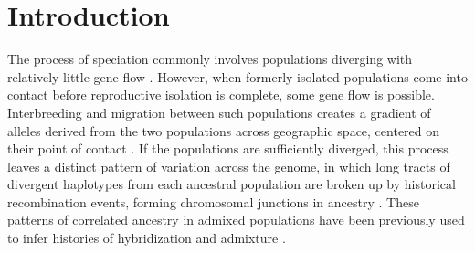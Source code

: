 \documentclass[11pt,letterpaper]{article}
\begin{document}
\linenumbers
\doublespacing


\section*{Introduction}


The process of speciation commonly involves populations diverging with relatively little gene flow \citep{Coyne2004}.  
However, when formerly isolated populations come into contact before reproductive isolation is complete, some gene flow is possible.
Interbreeding and migration between such populations  
creates a gradient of alleles derived from the two populations across geographic space,
centered on their point of contact \citep[reviewed by][]{Barton1985}. 
If the populations are sufficiently diverged, 
this process leaves a distinct pattern of variation across the genome, 
in which long tracts of divergent haplotypes from each ancestral population  
are broken up by historical recombination events,
forming chromosomal {junctions} in ancestry \citep{Fisher1954, Chapman2002, baird2003distribution}. 
These patterns of correlated ancestry in admixed populations have been previously used to infer histories of hybridization and admixture 
\citep[e.g.,][]{Gravel2012,Hellenthal2014,Harris2013,sedghifar2015spatial}.

\end{document}

